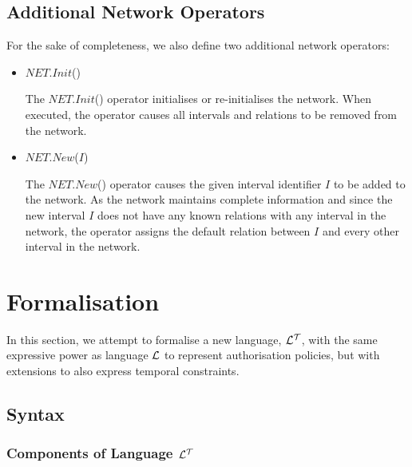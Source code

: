 \documentclass[11pt]{report}
\begin{document}
      \subsection{Additional Network Operators}

        For the sake of completeness, we also define two additional network
        operators:

        \begin{itemize}
          \item
            $NET.Init$()

            The $NET.Init$() operator initialises or re-initialises the
            network. When executed, the operator causes all intervals and
            relations to be removed from the network.

          \item
            $NET.New$($I$)

            The $NET.New$() operator causes the given interval identifier $I$
            to be added to the network. As the network maintains complete
            information and since the new interval $I$ does not have any known
            relations with any interval in the network, the operator assigns
            the default relation between $I$ and every other interval in the
            network.
        \end{itemize}

    \section{Formalisation}

      In this section, we attempt to formalise a new language, ${\cal L^T}$,
      with the same expressive power as language ${\cal L}$ to represent
      authorisation policies, but with extensions to also express temporal
      constraints.

      \subsection{Syntax}

        \subsubsection{Components of Language ${\cal L^T}$}
\end{document}
